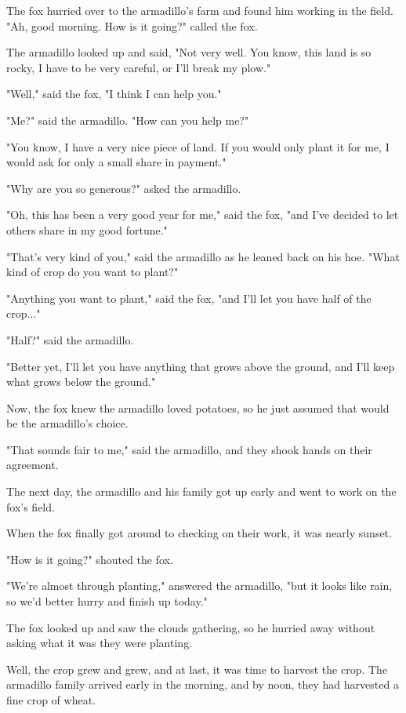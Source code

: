 The fox hurried over to the armadillo's farm and found him working in the field. "Ah, good morning. How is it going?" called the fox.

The armadillo looked up and said, "Not very well. You know, this land is so rocky, I have to be very careful, or I'll break my plow."

"Well," said the fox, "I think I can help you."

"Me?" said the armadillo. "How can you help me?"

"You know, I have a very nice piece of land. If you would only plant it for me, I would ask for only a small share in payment."

"Why are you so generous?" asked the armadillo.

"Oh, this has been a very good year for me," said the fox, "and I've decided to let others share in my good fortune."

"That's very kind of you," said the armadillo as he leaned back on his hoe. "What kind of crop do you want to plant?"

"Anything you want to plant," said the fox, "and I'll let you have half of the crop..."

"Half?" said the armadillo.

"Better yet, I'll let you have anything that grows above the ground, and I'll keep what grows below the ground."

Now, the fox knew the armadillo loved potatoes, so he just assumed that would be the armadillo's choice.

"That sounds fair to me," said the armadillo, and they shook hands on their agreement.

The next day, the armadillo and his family got up early and went to work on the fox's field.

When the fox finally got around to checking on their work, it was nearly sunset.

"How is it going?" shouted the fox.

"We're almost through planting," answered the armadillo, "but it looks like rain, so we'd better hurry and finish up today."

The fox looked up and saw the clouds gathering, so he hurried away without asking what it was they were planting.

Well, the crop grew and grew, and at last, it was time to harvest the crop. The armadillo family arrived early in the morning, and by noon, they had harvested a fine crop of wheat.

